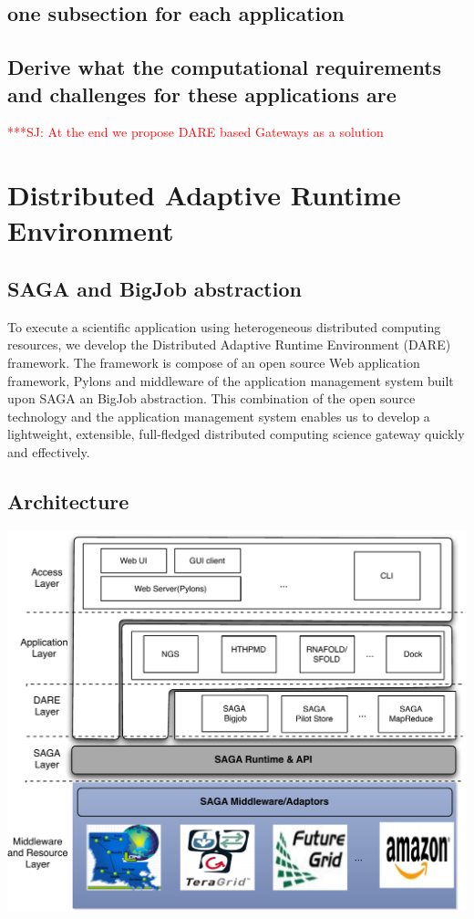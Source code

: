 \documentclass[12pt]{article}
\newcommand{\jhanote}[1]{ {\textcolor{red}     {***SJ: #1}}}
\newcommand{\jhanote}[1]{}
\begin{document}
\subsection{one subsection for each application}

\subsection{Derive what the computational requirements and challenges
  for these applications are}


\jhanote{At the end we propose DARE based Gateways as a solution}


\section{Distributed Adaptive Runtime Environment}

\subsection{SAGA and BigJob abstraction}

To execute a scientific application using heterogeneous distributed computing resources, we develop the Distributed Adaptive Runtime Environment (DARE) framework\cite{dareurl}.  The framework is compose of an open source Web application framework, Pylons
and middleware of the application management system built upon SAGA an BigJob abstraction\cite{saga-ccgrid10,saga-royalsoc,saga-web,jha2009developing,ecmls10}.  This combination of the open source technology and the application management system enables us to develop a lightweight, extensible, full-fledged distributed computing science gateway quickly and effectively\cite{pylonsurl}. 

\subsection{Architecture}
\includegraphics{figures/DAREOutline.pdf}
\end{document}
